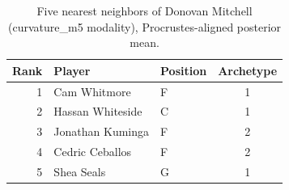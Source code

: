 \begin{table}[htbp]
  \centering\small
  \begin{tabular}{rllc}
    \toprule
    Rank & Player & Position & Archetype \\
    \midrule
    1 & Cam Whitmore & F & 1 \\
    2 & Hassan Whiteside & C & 1 \\
    3 & Jonathan Kuminga & F & 2 \\
    4 & Cedric Ceballos & F & 2 \\
    5 & Shea Seals & G & 1 \\
    \bottomrule
  \end{tabular}
  \caption{Five nearest neighbors of Donovan Mitchell (curvature_m5 modality), Procrustes-aligned posterior mean.}
  \label{tab:Donovan_Mitchell_neighbors_curvature_m5}
\end{table}


